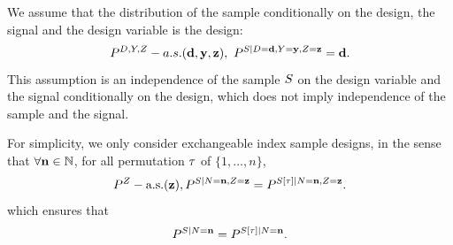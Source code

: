 We assume that the distribution of the sample conditionally on the design, the signal and the design variable is the design:
\begin{equation}\label{eq:SconditionalonDindependentonYZ}
P^{D,Y,Z}-a.s.(\mathbf{d},\mathbf{y},\mathbf{z}),~P^{S\mid D=\mathbf{d},Y=\mathbf{y},Z=\mathbf{z}}=\mathbf{d}.\end{equation}
This assumption is an independence of the sample $S$ on the design variable and the signal conditionally on the design, which does not imply independence of the sample and the signal.



%

 For simplicity, we only consider exchangeable index sample designs, in the sense that $\forall \mathbf{n}\in\mathbb{N}$, for all permutation $\tau$ of $\{1,\ldots,n\}$,
 \begin{equation}P^Z-\text{a.s.}(\mathbf{z}), P^{S\mid N=\mathbf{n},Z=\mathbf{z}}=P^{S[\tau]\mid N=\mathbf{n},Z=\mathbf{z}}\label{assumption:designindexexchangeability}.\end{equation}
which ensures that 
 \begin{equation}P^{S\mid N=\mathbf{n}}=P^{S[\tau]\mid N=\mathbf{n}}\label{assumption:designindexexchangeability}.\end{equation}


